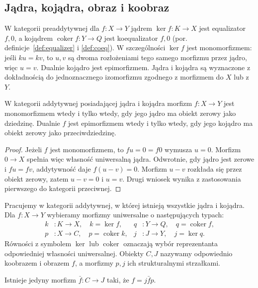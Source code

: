 \subsection{Jądra, kojądra, obraz i koobraz}
\begin{definicja}\label{cat:def:kernel-cokernel}
W kategorii preaddytywnej dla $f:X\to Y$ jądrem $\ker f:K\to X$ jest equalizator $f,0$, a kojądrem $\operatorname{coker}f:Y\to Q$ jest koequalizator $f,0$ (por. definicje~\ref{def:equalizer} i \ref{def:coeq}). W szczególności $\ker f$ jest monomorfizmem: jeśli $ku=kv$, to $u,v$ są dwoma rozłożeniami tego samego morfizmu przez jądro, więc $u=v$. Dualnie kojądro jest epimorfizmem. Jądra i kojądra są wyznaczone z dokładnością do jednoznacznego izomorfizmu zgodnego z morfizmem do $X$ lub z $Y$.
\end{definicja}
\begin{stwierdzenie}\label{cat:prop:mono-epi-zero-kernel}
W kategorii addytywnej posiadającej jądra i kojądra morfizm $f:X\to Y$ jest monomorfizmem wtedy i tylko wtedy, gdy jego jądro ma obiekt zerowy jako dziedzinę. Dualnie $f$ jest epimorfizmem wtedy i tylko wtedy, gdy jego kojądro ma obiekt zerowy jako przeciwdziedzinę.
\end{stwierdzenie}
\begin{proof}
Jeżeli $f$ jest monomorfizmem, to $fu=0=f0$ wymusza $u=0$. Morfizm $0\to X$ spełnia więc własność uniwersalną jądra. Odwrotnie, gdy jądro jest zerowe i $fu=fv$, addytywność daje $f(u-v)=0$. Morfizm $u-v$ rozkłada się przez obiekt zerowy, zatem $u-v=0$ i $u=v$. Drugi wniosek wynika z zastosowania pierwszego do kategorii przeciwnej.
\end{proof}
\begin{definicja}\label{cat:def:image-coimage}
Pracujemy w kategorii addytywnej, w której istnieją wszystkie jądra i kojądra. Dla $f:X\to Y$ wybieramy morfizmy uniwersalne o następujących typach:
\[
\begin{aligned}
 k&:K\to X,\quad k=\ker f,&
 q&:Y\to Q,\quad q=\operatorname{coker}f,\\
 p&:X\to C,\quad p=\operatorname{coker}k,&
 j&:J\to Y,\quad j=\ker q.
\end{aligned}
\]
Równości z symbolem $\ker$ lub $\operatorname{coker}$ oznaczają wybór reprezentanta odpowiedniej własności uniwersalnej. Obiekty $C,J$ nazywamy odpowiednio koobrazem i obrazem $f$, a morfizmy $p,j$ ich strukturalnymi strzałkami.
\end{definicja}
\begin{stwierdzenie}\label{cat:prop:coimage-image}
Istnieje jedyny morfizm $\bar f:C\to J$ taki, że $f=j\bar f p$.
\end{stwierdzenie}
